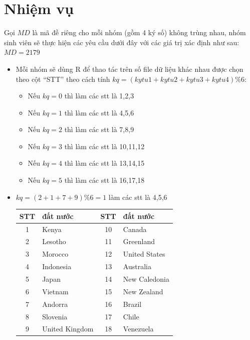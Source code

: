 \documentclass[a4paper]{article}
\theoremstyle{definition}
\begin{document}
\section{Nhiệm vụ}\label{requirement} 
Gọi $MD$ là mã đề riêng cho mỗi nhóm (gồm 4 ký số) không trùng nhau, nhóm sinh viên sẽ thực hiện các yêu cầu dưới đây với các giá trị xác định như sau:
$MD = 2179$
\begin{itemize}
	\item  Mỗi nhóm sẽ dùng R để thao tác trên số file dữ liệu khác nhau được chọn theo cột ``STT'' theo cách tính $kq = (kytu1  +  kytu2 +  kytu3 +  kytu4) \% 6$:
	\begin{itemize}
		\item Nếu $kq = 0$ thì làm các stt là {1,2,3}
		\item Nếu $kq = 1$ thì làm các stt là {4,5,6}
		\item Nếu $kq = 2$ thì làm các stt là {7,8,9}
		\item Nếu $kq = 3$ thì làm các stt là {10,11,12} 
		\item Nếu $kq = 4$ thì làm các stt là {13,14,15}
		\item Nếu $kq = 5$ thì làm các stt là {16,17,18}
	\end{itemize}
	
	\item $kq = (2 + 1 + 7 + 9) \% 6 = 1$ làm các stt là {4,5,6}
	
	\begin{center}
		\begin{tabular}{ c | l | c | l}
			
			STT & đất nước & STT & đất nước\\ \hline
			1 & Kenya & 10 & Canada\\ 
			2 & Lesotho &  11 & Greenland\\ 
			3 & Morocco &  12 & United States\\ 
			4 & Indonesia & 13 & Australia \\ 
			5 & Japan  & 14 & New Caledonia\\
			6 & Vietnam  & 15 & New Zealand\\ 
			7 & Andorra  & 16 & Brazil\\ 
			8 & Slovenia  & 17 & Chile\\ 
			9 & United Kingdom & 18 & Venezuela \\
			
			\hline
		\end{tabular}
	\end{center}
\end{itemize}
\end{document}
